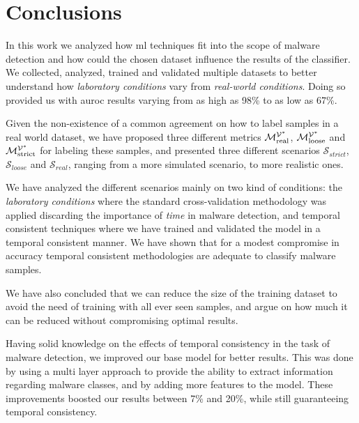 
\chapter{Conclusions}
\label{chapter:conclusions}

In this work we analyzed how \gls{ml} techniques fit into the scope of malware detection and how could the chosen dataset influence the results of the classifier.
We collected, analyzed, trained and validated multiple datasets to better understand how \textit{laboratory conditions} vary from \textit{real-world conditions}.
Doing so provided us with \gls{auroc} results varying from as high as 98\% to as low as 67\%.

Given the non-existence of a common agreement on how to label samples in a real world dataset, we have proposed three different metrics $\mathcal{M}_{\mathrm{real}}^{\mathcal{V}^*}$, $\mathcal{M}_{\mathrm{loose}}^{\mathcal{V}^*}$ and $\mathcal{M}_{\mathrm{strict}}^{\mathcal{V}^*}$ for labeling these samples, and presented three different scenarios $\mathcal{S}_{strict}$, $\mathcal{S}_{loose}$ and $\mathcal{S}_{real}$, ranging from a more simulated scenario, to more realistic ones.

We have analyzed the different scenarios mainly on two kind of conditions: the \textit{laboratory conditions} where the standard cross-validation methodology was applied discarding the importance of \emph{time} in malware detection, and temporal consistent techniques where we have trained and validated the model in a temporal consistent manner.
We have shown that for a modest compromise in accuracy temporal consistent methodologies are adequate to classify malware samples.

We have also concluded that we can reduce the size of the training dataset to avoid the need of training with all ever seen samples, and argue on how much it can be reduced without compromising optimal results.

Having solid knowledge on the effects of temporal consistency in the task of malware detection, we improved our base model for better results.
This was done by using a multi layer approach to provide the ability to extract information regarding malware classes, and by adding more features to the model.
These improvements boosted our results between 7\% and 20\%, while still guaranteeing temporal consistency.


